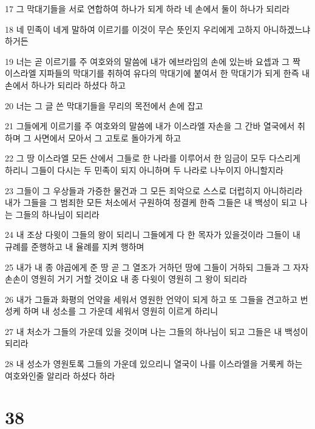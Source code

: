 \par 17 그 막대기들을 서로 연합하여 하나가 되게 하라 네 손에서 둘이 하나가 되리라
\par 18 네 민족이 네게 말하여 이르기를 이것이 무슨 뜻인지 우리에게 고하지 아니하겠느냐 하거든
\par 19 너는 곧 이르기를 주 여호와의 말씀에 내가 에브라임의 손에 있는바 요셉과 그 짝 이스라엘 지파들의 막대기를 취하여 유다의 막대기에 붙여서 한 막대기가 되게 한즉 내 손에서 하나가 되리라 하셨다 하고
\par 20 너는 그 글 쓴 막대기들을 무리의 목전에서 손에 잡고
\par 21 그들에게 이르기를 주 여호와의 말씀에 내가 이스라엘 자손을 그 간바 열국에서 취하며 그 사면에서 모아서 그 고토로 돌아가게 하고
\par 22 그 땅 이스라엘 모든 산에서 그들로 한 나라를 이루어서 한 임금이 모두 다스리게 하리니 그들이 다시는 두 민족이 되지 아니하며 두 나라로 나누이지 아니할지라
\par 23 그들이 그 우상들과 가증한 물건과 그 모든 죄악으로 스스로 더럽히지 아니하리라 내가 그들을 그 범죄한 모든 처소에서 구원하여 정결케 한즉 그들은 내 백성이 되고 나는 그들의 하나님이 되리라
\par 24 내 조상 다윗이 그들의 왕이 되리니 그들에게 다 한 목자가 있을것이라 그들이 내 규례를 준행하고 내 율례를 지켜 행하며
\par 25 내가 내 종 야곱에게 준 땅 곧 그 열조가 거하던 땅에 그들이 거하되 그들과 그 자자손손이 영원히 거기 거할 것이요 내 종 다윗이 영원히 그 왕이 되리라
\par 26 내가 그들과 화평의 언약을 세워서 영원한 언약이 되게 하고 또 그들을 견고하고 번성케 하며 내 성소를 그 가운데 세워서 영원히 이르게 하리니
\par 27 내 처소가 그들의 가운데 있을 것이며 나는 그들의 하나님이 되고 그들은 내 백성이 되리라
\par 28 내 성소가 영원토록 그들의 가운데 있으리니 열국이 나를 이스라엘을 거룩케 하는 여호와인줄 알리라 하셨다 하라

\chapter{38}

